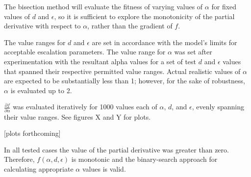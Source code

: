 \documentclass{article}
\begin{document}
The bisection method will evaluate the fitness of varying values of $\alpha$ for fixed values of $d$ and $\epsilon$, so it is sufficient to explore the monotonicity of the partial derivative with respect to $\alpha$, rather than the gradient of $f$.

The value ranges for $d$ and $\epsilon$ are set in accordance with the model's limits for acceptable escalation parameters.
The value range for $\alpha$ was set after experimentation with the resultant alpha values for a set of test $d$ and $\epsilon$ values that spanned their respective permitted value ranges.
Actual realistic values of $\alpha$ are expected to be substantially less than 1; however, for the sake of robustness, $\alpha$ is evaluated up to 2.

$\frac{\partial f}{\partial \alpha}$ was evaluated iteratively for 1000 values each of $\alpha$, $d$, and $\epsilon$, evenly spanning their value ranges. See figures X and Y for plots. \\

\begin{center}
  [plots forthcoming]
\end{center}

In all tested cases the value of the partial derivative was greater than zero. Therefore, $f(\alpha, d, \epsilon)$ is monotonic and the binary-search approach for calculating appropriate $\alpha$ values is valid.


%
\end{document}
